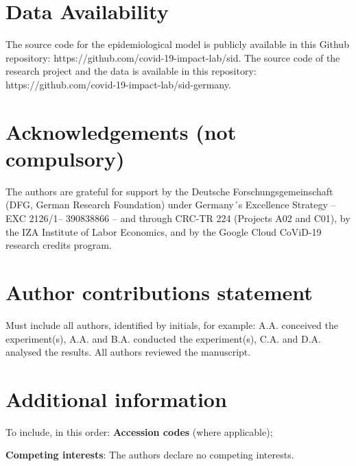 \documentclass[fleqn,10pt]{wlscirep}
\begin{document}
\section*{Data Availability}

The source code for the epidemiological model is publicly available in this Github
repository: https://github.com/covid-19-impact-lab/sid. The source code of the research
project and the data is available in this repository:
https://github.com/covid-19-impact-lab/sid-germany.



\section*{Acknowledgements (not compulsory)}

The authors are grateful for support by the Deutsche Forschungsgemeinschaft (DFG, German
Research Foundation) under Germany´s Excellence Strategy – EXC 2126/1– 390838866 – and
through CRC-TR 224 (Projects A02 and C01), by the IZA Institute of Labor Economics, and
by the Google Cloud CoViD-19 research credits program.

\section*{Author contributions statement}

Must include all authors, identified by initials, for example: A.A. conceived the
experiment(s),  A.A. and B.A. conducted the experiment(s), C.A. and D.A. analysed the
results.  All authors reviewed the manuscript.

\section*{Additional information}

To include, in this order: \textbf{Accession codes} (where applicable);

\textbf{Competing interests}: The authors declare no competing interests.
\end{document}
